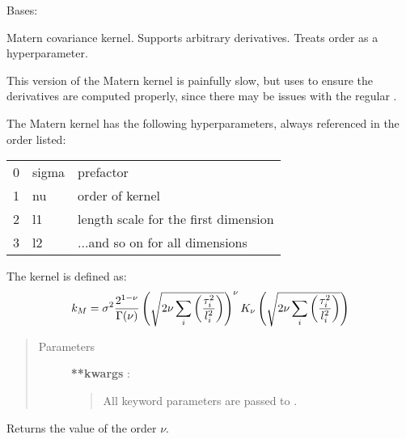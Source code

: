 \documentclass[letterpaper,10pt,english]{sphinxmanual}
\begin{document}

\begin{fulllineitems}
\label{gptools.kernel:gptools.kernel.matern.MaternKernelArb}
Bases: {\hyperref[gptools.kernel:gptools.kernel.core.ArbitraryKernel]{}}

Matern covariance kernel. Supports arbitrary derivatives. Treats order as a hyperparameter.

This version of the Matern kernel is painfully slow, but uses 
to ensure the derivatives are computed properly, since there may be issues
with the regular {\hyperref[gptools.kernel:gptools.kernel.matern.MaternKernel]{}}.

The Matern kernel has the following hyperparameters, always referenced in
the order listed:

\begin{tabulary}{\linewidth}{|L|L|L|}
\hline

0
 & 
sigma
 & 
prefactor
\\

1
 & 
nu
 & 
order of kernel
\\

2
 & 
l1
 & 
length scale for the first dimension
\\

3
 & 
l2
 & 
...and so on for all dimensions
\\
\hline\end{tabulary}


The kernel is defined as:
\begin{gather}
\begin{split}k_M = \sigma^2 \frac{2^{1-\nu}}{\Gamma(\nu)}
\left (\sqrt{2\nu \sum_i\left (\frac{\tau_i^2}{l_i^2}\right )}\right )^\nu
K_\nu\left(\sqrt{2\nu \sum_i\left(\frac{\tau_i^2}{l_i^2}\right)}\right)\end{split}\notag
\end{gather}\begin{quote}\begin{description}
\item[{Parameters}] \leavevmode
\textbf{**kwargs} :
\begin{quote}

All keyword parameters are passed to {\hyperref[gptools.kernel:gptools.kernel.core.ArbitraryKernel]{}}.
\end{quote}

\end{description}\end{quote}

\begin{fulllineitems}
\label{gptools.kernel:gptools.kernel.matern.MaternKernelArb.nu}
Returns the value of the order \(\nu\).

\end{fulllineitems}


\end{fulllineitems}
\end{document}
